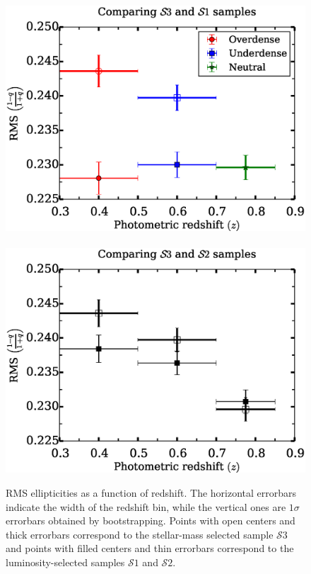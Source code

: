 \documentclass[twocolumn,useAMS,usenatbib]{mn2e}
\newcommand{\s}{\ensuremath{\mathcal{S}}}
\begin{document}
\begin{figure}
 \centering
 \includegraphics[width=1.0\columnwidth]{rms_ellip1_noevolution_wide} \
 \includegraphics[width=1.0\columnwidth]{rms_ellip1_Bbandevolution_wide}
 \caption{ RMS ellipticities as a function of redshift. The horizontal errorbars indicate
           the width of the redshift bin, while the vertical ones are $1\sigma$ errorbars obtained by
           bootstrapping. Points with open centers and thick errorbars correspond to the stellar-mass selected sample \s$3$
           and points with filled centers and thin errorbars correspond to the luminosity-selected samples \s$1$ and \s$2$.    
         }
 \label{fig:rms_ellip_wide}
\end{figure}
\end{document}

